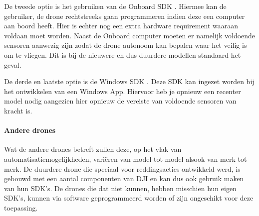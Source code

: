 De tweede optie is het gebruiken van de Onboard SDK \autocite{OnboardSDKDJI}. Hiermee kan de gebruiker, de drone rechtstreeks gaan programmeren indien deze een computer aan boord heeft. Hier is echter nog een extra hardware requirement waaraan voldaan moet worden. Naast de Onboard computer moeten er namelijk voldoende sensoren aanwezig zijn zodat de drone autonoom kan bepalen waar het veilig is om te vliegen. Dit is bij de nieuwere en dus duurdere modellen standaard het geval.

De derde en laatste optie is de Windows SDK \autocite{WindowsSDKDJI}. Deze SDK kan ingezet worden bij het ontwikkelen van een Windows App. Hiervoor heb je opnieuw een recenter model nodig aangezien hier opnieuw de vereiste van voldoende sensoren van kracht is. 

\paragraph{Andere drones}

Wat de andere drones betreft zullen deze, op het vlak van automatisatiemogelijkheden, variëren van model tot model alsook van merk tot merk. De duurdere drone die speciaal voor reddingsacties ontwikkeld werd, is gebouwd met een aantal componenten van DJI en kan dus ook gebruik maken van hun SDK's. De drones die dat niet kunnen, hebben misschien hun eigen SDK's, kunnen via software geprogrammeerd worden of zijn ongeschikt voor deze toepassing.

